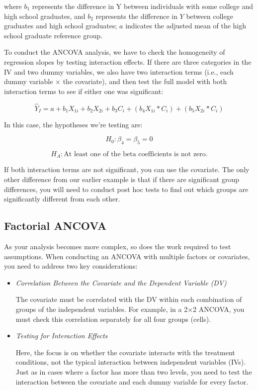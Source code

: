 \documentclass[
  letterpaper,
  DIV=11,
  numbers=noendperiod]{scrreprt}
\begin{document}
where \(b_1\) represents the difference in Y between individuals with
some college and high school graduates, and \(b_2\) represents the
difference in \(Y\) between college graduates and high school graduates;
\(a\) indicates the adjusted mean of the high school graduate reference
group.

To conduct the ANCOVA analysis, we have to check the homogeneity of
regression slopes by testing interaction effects. If there are three
categories in the IV and two dummy variables, we also have two
interaction terms (i.e., each dummy variable × the covariate), and then
test the full model with both interaction terms to see if either one was
significant:

\[
\hat{Y}_I = a + b_1X_{1i} + b_2X_{2i}+ b_3C_i + (b_4X_{1i}*C_i) + (b_5X_{2i}*C_i)
\]

In this case, the hypotheses we're testing are:

\[
H_0: \beta_4 = \beta_5 = 0 
\]

\[
H_A: \text{At least one of the beta coefficients is not zero.} 
\]

If both interaction terms are not significant, you can use the
covariate. The only other difference from our earlier example is that if
there are significant group differences, you will need to conduct post
hoc tests to find out which groups are significantly different from each
other.

\subsection{Factorial ANCOVA}\label{factorial-ancova}

As your analysis becomes more complex, so does the work required to test
assumptions. When conducting an ANCOVA with multiple factors or
covariates, you need to address two key considerations:

\begin{itemize}
\item
  \emph{Correlation Between the Covariate and the Dependent Variable
  (DV)}

  The covariate must be correlated with the DV within each combination
  of groups of the independent variables. For example, in a 2×2 ANCOVA,
  you must check this correlation separately for all four groups
  (cells).
\item
  \emph{Testing for Interaction Effects}

  Here, the focus is on whether the covariate interacts with the
  treatment conditions, not the typical interaction between independent
  variables (IVs). Just as in cases where a factor has more than two
  levels, you need to test the interaction between the covariate and
  each dummy variable for every factor.
\end{itemize}
\end{document}
